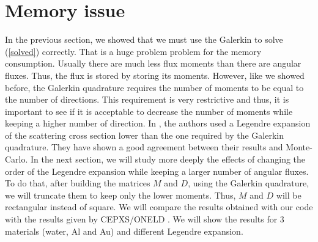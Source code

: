 \section{Memory issue}
In the previous section, we showed that we must use the Galerkin to solve
(\ref{solved}) correctly. That is a huge problem problem for the memory
consumption. Usually there are much less flux moments than there are angular
fluxes. Thus, the flux is stored by storing its moments. However, like we
showed before, the Galerkin quadrature requires the number of moments to be
equal to the number of directions. This requirement is very restrictive and
thus, it is important to see if it is acceptable to decrease the number of
moments while keeping a higher number of direction. In \cite{mem}, the authors used a 
Legendre expansion of the scattering cross section lower than the one required by the
Galerkin quadrature. They have shown a good agreement between their results and
Monte-Carlo. In the next section, we will study more deeply the effects of changing
the order of the Legendre expansion while keeping a larger number of angular
fluxes. To do that, after building the matrices $M$ and $D$, using the Galerkin 
quadrature, we will truncate them to keep only the lower moments. Thus, $M$
and $D$ will be rectangular instead of square. We will compare the results obtained 
with our code with the results given by CEPXS/ONELD \cite{cepxs}. We will show
the results for 3 materials (water, Al and Au) and different Legendre expansion.

